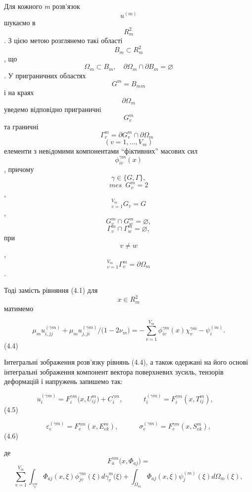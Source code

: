 Для кожного \emph{m }розв'язок \[u^{(m)}{}\] шукаємо в \[R_{m}^{2}{}\].
З цією метою розглянемо такі області \[{B_{m}\subset R_{m}^{2}}{}\], що
\[{\Omega_{m}\subset B_{m},\quad\partial{\Omega_{m} \cap \partial}{B_{m} = \varnothing}}{}\].
У приграничних областях \[{{G^{m} = B_{m}}{}_{m}}{}\] і на краях
\[{\partial\Omega_{m}}{}\]\textsubscript{ }уведемо відповідно
пригра­нич­нi \[G_{v}^{m}{}\] та граничні
\[{{\Gamma_{v}^{m} = \partial}{G_{v}^{m} \cap \partial}\Omega_{m}\mspace{9mu}}{}\]\[{({v = 1},\text{.}\text{.}\text{.},V_{m})}{}\]\textsubscript{
}елементи з невiдомими компонентами ``фiктивних'' ма­сових сил
\[{\phi_{\mathit{\text{iv}}}^{\mathit{\gamma m}}(x)}{}\], при­чому
\[{\gamma\in{\{{G,\Gamma}\}},}{}\]\[{\mathit{\text{mes}}\mspace{9mu}{G_{v}^{m} = 2}}{}\],
\[{{}_{v = 1}^{V_{m}}G_{v}{= G}}{}\],
\[{{{G_{v}^{m} \cap G_{w}^{m}} = \varnothing},}{}\]
\[{{{\Gamma_{v}^{m} \cap \Gamma_{w}^{m}} = \varnothing},}{}\] при
\[{v \neq w}{}\],
\[{{}_{v = 1}^{V_{m}}\Gamma_{v}^{m}{{= \partial}\Omega_{m}}}{}\].

Тоді замість рівняння (4.1) для \[{x\in R_{m}^{2}}{}\] матимемо

\[{\mu_{m}{u_{i,\mathit{\text{jj}}}^{(\mathit{\gamma m})} + \mu_{m}}{u_{j,\mathit{\text{ji}}}^{(\mathit{\gamma m})}/(}{1 - 2}\nu_{m}{) = {{- {\sum_{v = 1}^{V_{m}}{\phi_{\mathit{\text{iv}}}^{\mathit{\gamma m}}(x)\chi_{v}^{\mathit{\gamma m}}}}} - \psi_{i}^{(m)}}}\text{.}}{}\]\textsubscript{}(4.4)

Інтегральні зображення розв'язку рівнянь (4.4), а також одержані на його
основі інтегральні зображення компонент вектора поверхневих зусиль,
тензорів деформацій і напружень запишемо так:

\[{{u_{i}^{(\mathit{\gamma m})} = F_{i}^{\mathit{\gamma m}}}(x,U_{\mathit{\text{ij}}}^{m}{) + C_{i}^{\mathit{\gamma m}}},\mspace{54mu}{t_{i}^{(\mathit{\gamma m})} = F_{i}^{\mathit{\gamma m}}}(x,T_{\mathit{\text{ij}}}^{m}),\quad}{}\]\textsubscript{}(4.5)

\[{{\varepsilon_{e}^{(\mathit{\gamma m})} = F_{e}^{\mathit{\gamma m}}}(x,E_{\mathit{\text{ek}}}^{m}),\mspace{54mu}{\sigma_{e}^{(\mathit{\gamma m})} = F_{e}^{\mathit{\gamma m}}}(x,S_{\mathit{\text{ek}}}^{m}),}{}\]\textsubscript{}(4.6)

де
\[{F_{a}^{\mathit{\gamma m}}(x,\Phi_{\mathit{\text{aj}}}{) =}}{}\]\[{\sum_{v = 1}^{V_{m}}{\int_{\gamma_{v}^{m}}{\Phi_{\mathit{\text{aj}}}{(x,\xi)\phi_{\mathit{\text{jv}}}^{\mathit{\gamma m}}}{(\xi)\mathit{d\gamma}_{v}^{m}}{(\xi{) + {\int_{\Omega_{m}}{\Phi_{\mathit{\text{aj}}}{(x,\xi)\psi_{j}^{(m)}}{(\xi)d\Omega_{m}}{(\xi)}}}}}}},}{}\]

